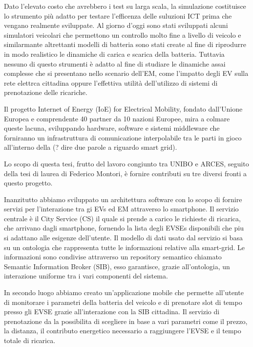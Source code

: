 Dato l'elevato costo che avrebbero i test su larga scala, la simulazione costituisce lo strumento più adatto per testare l'efficenza delle suluzioni ICT prima che vengano realmente sviluppate. Al giorno d'oggi sono stati sviluppati alcuni simulatori veicolari che permettono un controllo molto fine a livello di veicolo e similarmante altrettanti modelli di batteria sono stati create al fine di riprodurre in modo realistico le dinamiche di carica e scarica della batteria.
Tuttavia nessuno di questo strumenti è adatto al fine di studiare le dinamiche assai complesse che si presentano 
nello scenario dell'EM, come l'impatto degli EV sulla rete elettrca cittadina oppure l'effettiva utilità dell'utilizzo di sistemi di prenotazione delle ricariche. 

Il progetto Internet of Energy (IoE) for Electrical Mobility, fondato dall'Unione Europea e comprendente 40 partner da 10 nazioni Europee, mira a colmare queste lacuna, sviluppando hardware, software e sistemi middleware che forniranno un infrastruttura di comunicazione interpolabile tra le parti in gioco all'interno della (? dire due parole a riguardo smart grid).

Lo scopo di questa tesi, frutto del lavoro congiunto tra UNIBO e ARCES, seguito della tesi di laurea di 
Federico Montori, è fornire contributi su tre diversi fronti a questo progetto. 

Inanzitutto abbiamo sviluppato un architettura software con lo scopo di fornire servizi per l'interazione
tra gi EVs ed EM attraverso lo smartphone. Il servizio centrale è il City Service (CS) il quale
si prende a carico le richieste di ricarica, che arrivano dagli smartphone, fornendo la lista degli EVSEs 
disponibili che piu si adattano alle esigenze dell'utente. Il modello di dati usato dal servizio si basa
su un ontologia che rappresenta tutte le informazioni relative alla smart-grid. Le informazioni sono condivise
attraverso un repository semantico chiamato Semantic Information Broker (SIB), esso garantisce, grazie all'ontologia,
un interazione uniforme tra i vari componenti del sistema.

In secondo luogo abbiamo creato un'applicazione mobile che permette all'utente di monitorare i parametri
della batteria del veicolo e di prenotare slot di tempo presso gli EVSE grazie all'interazione con la 
SIB cittadina. Il servizio di prenotazione da la possibilita di scegliere in base a vari parametri come il prezzo, 
la distanza, il contributo energetico necessario a raggiungere l'EVSE e il tempo totale di ricarica.

